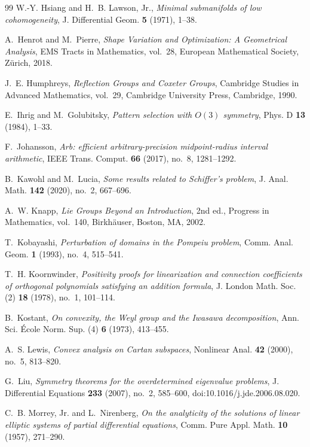 \documentclass[11pt]{amsart}
\theoremstyle{definition}
\theoremstyle{remark}
\numberwithin{equation}{section}
\begin{document}
\begin{thebibliography}{99}
W.-Y. Hsiang and H.~B. Lawson, Jr., \emph{Minimal submanifolds of low cohomogeneity}, J. Differential Geom. \textbf{5} (1971), 1--38.

A.~Henrot and M.~Pierre, \emph{Shape Variation and Optimization: A Geometrical Analysis}, EMS Tracts in Mathematics, vol.~28, European Mathematical Society, Z\"urich, 2018.

J.~E. Humphreys, \emph{Reflection Groups and Coxeter Groups}, Cambridge Studies in Advanced Mathematics, vol.~29, Cambridge University Press, Cambridge, 1990.

E.~Ihrig and M.~Golubitsky, \emph{Pattern selection with $O(3)$ symmetry}, Phys. D \textbf{13} (1984), 1--33.

F.~Johansson, \emph{Arb: efficient arbitrary-precision midpoint-radius interval arithmetic}, IEEE Trans. Comput. \textbf{66} (2017), no.~8, 1281--1292.

B.~Kawohl and M.~Lucia, \emph{Some results related to Schiffer's problem}, J. Anal. Math. \textbf{142} (2020), no.~2, 667--696.

A.~W. Knapp, \emph{Lie Groups Beyond an Introduction}, 2nd ed., Progress in Mathematics, vol.~140, Birkh\"auser, Boston, MA, 2002.

T.~Kobayashi, \emph{Perturbation of domains in the Pompeiu problem}, Comm. Anal. Geom. \textbf{1} (1993), no.~4, 515--541.

T.~H. Koornwinder, \emph{Positivity proofs for linearization and connection coefficients of orthogonal polynomials satisfying an addition formula}, J. London Math. Soc. (2) \textbf{18} (1978), no.~1, 101--114.

B.~Kostant, \emph{On convexity, the Weyl group and the Iwasawa decomposition}, Ann. Sci. \'Ecole Norm. Sup. (4) \textbf{6} (1973), 413--455.

A.~S. Lewis, \emph{Convex analysis on Cartan subspaces}, Nonlinear Anal. \textbf{42} (2000), no.~5, 813--820.

G.~Liu, \emph{Symmetry theorems for the overdetermined eigenvalue problems}, J. Differential Equations \textbf{233} (2007), no.~2, 585--600, doi:10.1016/j.jde.2006.08.020.

C.~B. Morrey, Jr. and L.~Nirenberg, \emph{On the analyticity of the solutions of linear elliptic systems of partial differential equations}, Comm. Pure Appl. Math. \textbf{10} (1957), 271--290.


\end{thebibliography}
\end{document}
